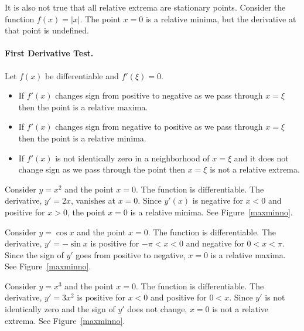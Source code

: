 It is also not true that all relative extrema are stationary points.  Consider
the function $f(x) = |x|$.  The point $x = 0$ is a relative minima, but
the derivative at that point is undefined.


\paragraph{First Derivative Test.}
Let $f(x)$ be differentiable and $f'(\xi) = 0$.
\begin{itemize}
\item
  If $f'(x)$ changes sign from positive to negative as we pass through $x = \xi$
  then the point is a relative maxima.
\item
  If $f'(x)$ changes sign from negative to positive as we pass through $x = \xi$
  then the point is a relative minima.
\item
  If $f'(x)$ is not identically zero in a neighborhood of $x = \xi$ and it 
  does not change sign as we pass through the point then $x = \xi$ is 
  not a relative extrema.
\end{itemize}



\begin{Example}
  Consider $y = x^2$ and the point $x = 0$.  The function is differentiable.
  The derivative, $y' = 2x$, vanishes at $x = 0$.  Since $y'(x)$ is negative
  for $x < 0$ and positive for $x > 0$, the point $x = 0$ is a relative 
  minima.  See Figure~\ref{maxminno}.
\end{Example}





\begin{Example}
  Consider $y = \cos x$ and the point $x = 0$.  The function is differentiable.
  The derivative, $y' = - \sin x$ is positive for $-\pi < x < 0$ and negative
  for $0 < x < \pi$.  Since the sign of $y'$ goes from positive to negative,
  $x = 0$ is a relative maxima.  See Figure~\ref{maxminno}.
\end{Example}




\begin{Example}
  Consider $y = x^3$ and the point $x = 0$.  The function is differentiable.
  The derivative, $y' = 3 x^2$ is positive for $x < 0$ and positive
  for $0 < x$.  Since $y'$ is not identically zero and the sign of $y'$ 
  does not change, $x = 0$ is not a relative extrema.  See Figure~\ref{maxminno}.
\end{Example}



